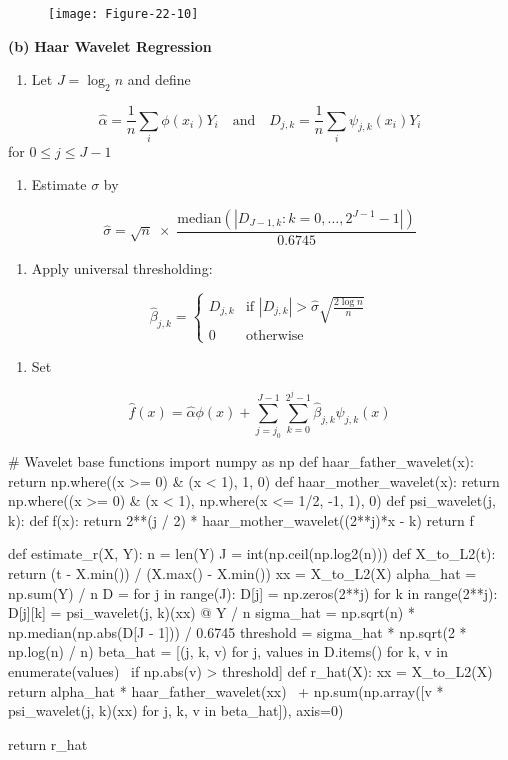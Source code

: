 \begin{figure}[H]
\centering
\texttt{[image: Figure-22-10]}
\end{figure}

\textbf{(b)}
\textbf{Haar Wavelet Regression}
\begin{enumerate}[tightlist,label={\arabic*.}]
\item
  Let \(J = \log_{2} n\) and define
\end{enumerate}
\[
\hat{\alpha} = \frac{1}{n} \sum_{i} \phi(x_{i}) Y_{i}
\quad \text{and} \quad
D_{j, k} = \frac{1}{n} \sum_{i} \psi_{j, k}(x_{i}) Y_{i}
\]
for \(0 \leq j \leq J - 1\)
\begin{enumerate}[tightlist,label={\arabic*.}]
\item
  Estimate \(\sigma\) by
\end{enumerate}
\[
\hat{\sigma} = \sqrt{n} \; \times \; \frac{\text{median} \left( \left| D_{J-1, k} : k = 0, \dots, 2^{J - 1} - 1\right| \right)}{0.6745}
\]
\begin{enumerate}[tightlist,label={\arabic*.},resume]
\item
  Apply universal thresholding:
\end{enumerate}
\[
\hat{\beta}_{j, k} = \begin{cases}
D_{j, k} & \text{if } \left| D_{j, k} \right| > \hat{\sigma} \sqrt{\frac{2 \log n}{n}} \\
0 & \text{otherwise}
\end{cases}
\]
\begin{enumerate}[tightlist,label={\arabic*.},resume]
\item
  Set
\end{enumerate}
\[
\hat{f}(x) = \hat{\alpha} \phi(x) + \sum_{j = j_{0}}^{J - 1} \sum_{k = 0}^{2^{j} - 1} \hat{\beta}_{j, k} \psi_{j, k}(x)
\]

\begin{python}
# Wavelet base functions
import numpy as np
def haar_father_wavelet(x):
    return np.where((x >= 0) & (x < 1), 1, 0)
def haar_mother_wavelet(x):
    return np.where((x >= 0) & (x < 1),  np.where(x <= 1/2, -1, 1), 0)
def psi_wavelet(j, k):
    def f(x):
        return 2**(j / 2) * haar_mother_wavelet((2**j)*x - k)
    return f
\end{python}

\begin{python}
def estimate_r(X, Y):
    n = len(Y)
    J = int(np.ceil(np.log2(n)))
    def X_to_L2(t):
        return (t - X.min()) / (X.max() - X.min())
    xx = X_to_L2(X)
    alpha_hat = np.sum(Y) / n
    D = {}
    for j in range(J):
        D[j] = np.zeros(2**j)
        for k in range(2**j):
            D[j][k] = psi_wavelet(j, k)(xx) @ Y / n
    sigma_hat = np.sqrt(n) * np.median(np.abs(D[J - 1])) / 0.6745
    threshold = sigma_hat * np.sqrt(2 * np.log(n) / n)
    beta_hat = [(j, k, v) for j, values in D.items() for k, v in enumerate(values) \
        if np.abs(v) > threshold]
    def r_hat(X):
        xx = X_to_L2(X)
        return alpha_hat * haar_father_wavelet(xx) \
            + np.sum(np.array([v * psi_wavelet(j, k)(xx) for j, k, v in beta_hat]), axis=0)
    
    return r_hat
\end{python}

